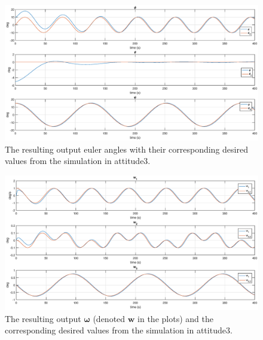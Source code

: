 \begin{figure}[!htb]
	\centering
	\includegraphics[width=1.00\textwidth]{figures/3_euler.eps}
	\caption{The resulting output euler angles with their corresponding desired values from the simulation in attitude3.}
\label{fig:sim_attitude3_euler}
\end{figure}

\begin{figure}[!htb]
	\centering
	\includegraphics[width=1.00\textwidth]{figures/3_omega.eps}
	\caption{The resulting output $\boldsymbol{\omega}$ (denoted $\mathbf{w}$ in the plots) and the corresponding desired values from the simulation in attitude3.}
\label{fig:sim_attitude3_omega}
\end{figure}

